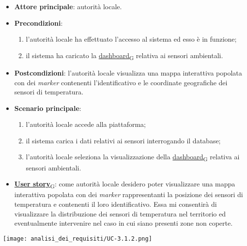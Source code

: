 \begin{itemize}
	\item \textbf{Attore principale}: autorità locale.
	\item \textbf{Precondizioni}:
	      \begin{enumerate}
		      \item l'autorità locale ha effettuato l'accesso al sistema ed esso è in funzione;
		      \item il sistema ha caricato la \href{https://7last.github.io/docs/pb/documentazione-interna/glossario\#dashboard}{dashboard\textsubscript{G}} relativa ai sensori ambientali.
	      \end{enumerate}
	\item \textbf{Postcondizioni}: l'autorità locale visualizza una mappa interattiva popolata con dei \textit{marker} contenenti l'identificativo e le coordinate geografiche dei sensori di temperatura.
	\item \textbf{Scenario principale}:
	      \begin{enumerate}
		      \item l'autorità locale accede alla piattaforma;
		      \item il sistema carica i dati relativi ai sensori interrogando il database;
		      \item l'autorità locale seleziona la visualizzazione della \href{https://7last.github.io/docs/pb/documentazione-interna/glossario\#dashboard}{dashboard\textsubscript{G}} relativa ai sensori ambientali.
	      \end{enumerate}
	\item \href{https://7last.github.io/docs/pb/documentazione-interna/glossario\#user-story}{\textbf{User story}\textsubscript{G}}:
	      come autorità locale desidero poter visualizzare una mappa interattiva popolata con dei \textit{marker} rappresentanti la posizione dei sensori di temperatura e contenenti il loro identificativo. Essa mi consentirà di visualizzare la distribuzione dei sensori di temperatura nel territorio ed eventualmente intervenire nel caso in cui siano presenti zone non coperte.
\end{itemize}
\begin{center}
	\texttt{[image: analisi\_dei\_requisiti/UC-3.1.2.png]}
\end{center}


